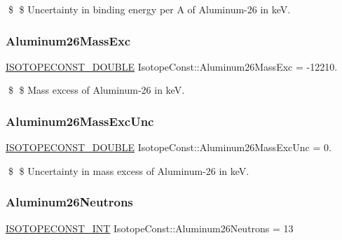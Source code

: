 \$ \$ Uncertainty in binding energy per A of Aluminum-\/26 in keV. \mbox{\label{group___isotope_const-_aluminum-_al26_gae230aed5c8d6845fb1b7027af26019bd}} 
\subsubsection{\texorpdfstring{Aluminum26\+Mass\+Exc}{Aluminum26MassExc}}
{\footnotesize\ttfamily \mbox{\hyperlink{group___isotope_const-_macros_ga8f45a7272ce02c0b4c65c44636ed719a}{I\+S\+O\+T\+O\+P\+E\+C\+O\+N\+S\+T\+\_\+\+D\+O\+U\+B\+LE}} Isotope\+Const\+::\+Aluminum26\+Mass\+Exc = -\/12210.}

\$ \$ Mass excess of Aluminum-\/26 in keV. \mbox{\label{group___isotope_const-_aluminum-_al26_ga0028915102820efdced56d7ddc496f23}} 
\subsubsection{\texorpdfstring{Aluminum26\+Mass\+Exc\+Unc}{Aluminum26MassExcUnc}}
{\footnotesize\ttfamily \mbox{\hyperlink{group___isotope_const-_macros_ga8f45a7272ce02c0b4c65c44636ed719a}{I\+S\+O\+T\+O\+P\+E\+C\+O\+N\+S\+T\+\_\+\+D\+O\+U\+B\+LE}} Isotope\+Const\+::\+Aluminum26\+Mass\+Exc\+Unc = 0.}

\$ \$ Uncertainty in mass excess of Aluminum-\/26 in keV. \mbox{\label{group___isotope_const-_aluminum-_al26_ga3c9f676103637cd6421f7ae595e9001e}} 
\subsubsection{\texorpdfstring{Aluminum26\+Neutrons}{Aluminum26Neutrons}}
{\footnotesize\ttfamily \mbox{\hyperlink{group___isotope_const-_macros_ga5f18360b3e99483a35c32d789e62621c}{I\+S\+O\+T\+O\+P\+E\+C\+O\+N\+S\+T\+\_\+\+I\+NT}} Isotope\+Const\+::\+Aluminum26\+Neutrons = 13}

